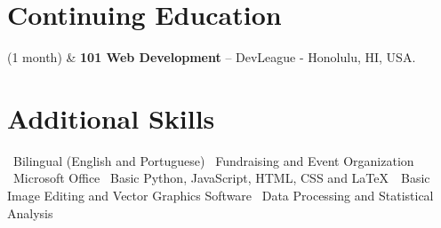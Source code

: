\documentclass[11pt, a4paper]{article}
\newcommand{\Year}[1]{\fontsize{10pt}{0}\selectfont #1}
\begin{document}
\section*{Continuing Education}

\begin{EntriesTable}
	\Year{2019 (1 month)}  &
	\textbf{101 Web Development} -- DevLeague - Honolulu, HI, USA.
	\\
\end{EntriesTable}


\section*{Additional Skills}

	\textbullet \ Bilingual (English and Portuguese) \textbullet \ Fundraising and Event Organization \textbullet \ Microsoft Office \textbullet \ Basic Python, JavaScript, HTML, CSS and \LaTeX\ \textbullet \ Basic Image Editing and Vector Graphics Software \textbullet \ Data Processing and Statistical Analysis
\end{document}
